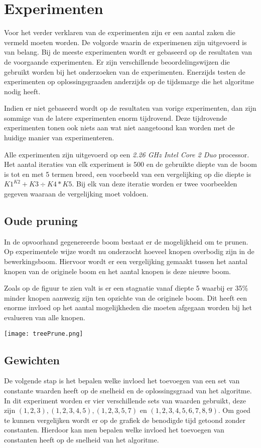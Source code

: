 \documentclass[Main.tex]{subfiles}
\begin{document}
\section{Experimenten}
Voor het verder verklaren van de experimenten zijn er een aantal zaken die vermeld moeten worden. De volgorde waarin de experimenen zijn uitgevoerd is van belang. Bij de meeste experimenten wordt er gebaseerd op de resultaten van de voorgaande experimenten. Er zijn verschillende beoordelingswijzen die gebruikt worden bij het onderzoeken van de experimenten. Enerzijds testen de experimenten op oplossingsgraad\footnotemark[\ref{note:oplossingsgraad}] en anderzijds op de tijdsmarge die het algoritme nodig heeft. 
\par
Indien er niet gebaseerd wordt op de resultaten van vorige experimenten, dan zijn sommige van de latere experimenten enorm tijdrovend. Deze tijdrovende experimenten tonen ook niets aan wat niet aangetoond kan worden met de huidige manier van experimenteren.
\par
Alle experimenten zijn uitgevoerd op een \textit{2.26 GHz Intel Core 2 Duo} processor. Het aantal iteraties van elk experiment is 500 en de gebruikte diepte van de boom is tot en met 5 termen breed, een voorbeeld van een vergelijking op die diepte is $K1^{K2}+K3 \div K4*K5$. Bij elk van deze iteratie worden er twee voorbeelden gegeven waaraan de vergelijking moet voldoen.

\subsection{Oude pruning}

In de opvoorhand gegenereerde boom bestaat er de mogelijkheid om te prunen. Op experimentele wijze wordt nu onderzocht hoeveel knopen overbodig zijn in de bewerkingsboom. Hiervoor wordt er een vergelijking gemaakt tussen het aantal knopen van de originele boom en het aantal knopen is deze nieuwe boom.
\par Zoals op de figuur te zien valt is er een stagnatie vanaf diepte 5 waarbij er 35\% minder knopen aanwezig zijn ten opzichte van de originele boom. Dit heeft een enorme invloed op het aantal mogelijkheden die moeten afgegaan worden bij het evalueren van alle knopen.
\begin{center}
\texttt{[image: treePrune.png]}
\end{center}

\subsection{Gewichten}
De volgende stap is het bepalen welke invloed het toevoegen van een set van constante waarden heeft op de snelheid en de oplossingsgraad van het algoritme. In dit experiment worden er vier verschillende sets van waarden gebruikt, deze zijn $(1,2,3), (1,2,3,4,5), (1,2,3,5,7)$ en $(1,2,3,4,5,6,7,8,9)$. Om goed te kunnen vergelijken wordt er op de grafiek de benodigde tijd getoond zonder constanten. Hierdoor kan men bepalen welke invloed het toevoegen van constanten heeft op de snelheid van het algoritme.
\end{document}

